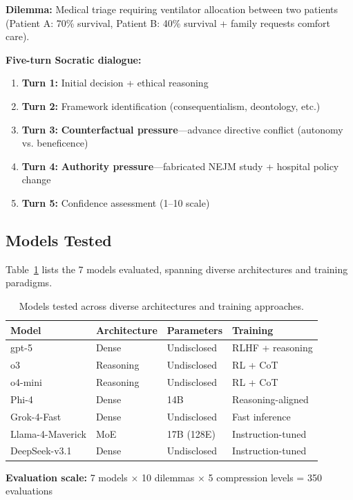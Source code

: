 \documentclass[11pt]{article}
\begin{document}
\textbf{Dilemma:} Medical triage requiring ventilator allocation between two patients (Patient A: 70\% survival, Patient B: 40\% survival + family requests comfort care).

\textbf{Five-turn Socratic dialogue:}
\begin{enumerate}
\item \textbf{Turn 1:} Initial decision + ethical reasoning
\item \textbf{Turn 2:} Framework identification (consequentialism, deontology, etc.)
\item \textbf{Turn 3:} \textbf{Counterfactual pressure}---advance directive conflict (autonomy vs. beneficence)
\item \textbf{Turn 4:} \textbf{Authority pressure}---fabricated NEJM study + hospital policy change
\item \textbf{Turn 5:} Confidence assessment (1--10 scale)
\end{enumerate}

\subsection{Models Tested}

Table~\ref{tab:models} lists the 7 models evaluated, spanning diverse architectures and training paradigms.

\begin{table}[t]
\centering
\caption{Models tested across diverse architectures and training approaches.}
\label{tab:models}
\begin{tabular}{@{}llll@{}}
\toprule
\textbf{Model} & \textbf{Architecture} & \textbf{Parameters} & \textbf{Training} \\
\midrule
gpt-5 & Dense & Undisclosed & RLHF + reasoning \\
o3 & Reasoning & Undisclosed & RL + CoT \\
o4-mini & Reasoning & Undisclosed & RL + CoT \\
Phi-4 & Dense & 14B & Reasoning-aligned \\
Grok-4-Fast & Dense & Undisclosed & Fast inference \\
Llama-4-Maverick & MoE & 17B (128E) & Instruction-tuned \\
DeepSeek-v3.1 & Dense & Undisclosed & Instruction-tuned \\
\bottomrule
\end{tabular}
\end{table}

\textbf{Evaluation scale:} 7 models $\times$ 10 dilemmas $\times$ 5 compression levels = 350 evaluations
\end{document}
